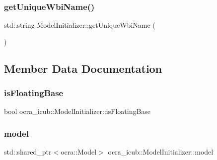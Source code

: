 \hypertarget{classocra__icub_1_1ModelInitializer_a086ea4822765ab6daff59fae1db0bd11}{}\label{classocra__icub_1_1ModelInitializer_a086ea4822765ab6daff59fae1db0bd11} 
\subsubsection{\texorpdfstring{get\+Unique\+Wbi\+Name()}{getUniqueWbiName()}}
{\footnotesize\ttfamily std\+::string Model\+Initializer\+::get\+Unique\+Wbi\+Name (\begin{DoxyParamCaption}{ }\end{DoxyParamCaption})\hspace{0.3cm}{\ttfamily [private]}}



\subsection{Member Data Documentation}
\hypertarget{classocra__icub_1_1ModelInitializer_a51d73f808c75fbc1284f460e7ff66d6a}{}\label{classocra__icub_1_1ModelInitializer_a51d73f808c75fbc1284f460e7ff66d6a} 
\subsubsection{\texorpdfstring{is\+Floating\+Base}{isFloatingBase}}
{\footnotesize\ttfamily bool ocra\+\_\+icub\+::\+Model\+Initializer\+::is\+Floating\+Base\hspace{0.3cm}{\ttfamily [private]}}

\hypertarget{classocra__icub_1_1ModelInitializer_ab7fb1fe2773837be8b3b41b75ef8f9d6}{}\label{classocra__icub_1_1ModelInitializer_ab7fb1fe2773837be8b3b41b75ef8f9d6} 
\subsubsection{\texorpdfstring{model}{model}}
{\footnotesize\ttfamily std\+::shared\+\_\+ptr$<$ocra\+::\+Model$>$ ocra\+\_\+icub\+::\+Model\+Initializer\+::model\hspace{0.3cm}{\ttfamily [private]}}

